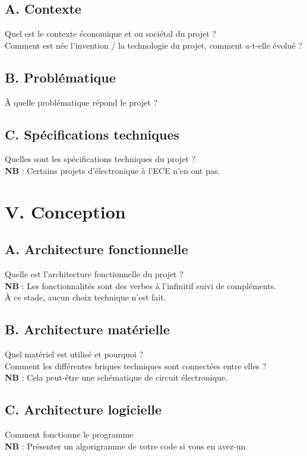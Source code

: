 \documentclass[a4paper,11pt]{book}
\begin{document}
\subsection*{A. Contexte}
Quel est le contexte économique et ou sociétal du projet ?\\
\noindent Comment est née l’invention / la technologie du projet, comment a-t-elle évolué ?


\subsection*{B. Problématique}
À quelle problématique répond le projet ?

\subsection*{C. Spécifications techniques}
Quelles sont les spécifications techniques du projet ?\\
\noindent \textbf{NB} : Certains projets d’électronique à l’ECE n’en ont pas.

\newpage
\section*{V. Conception}
\subsection*{A. Architecture fonctionnelle}
Quelle est l’architecture fonctionnelle du projet ? \\
\noindent \textbf{NB} : Les fonctionnalités sont des verbes à l’infinitif suivi de compléments.\\
\noindent À ce stade, aucun choix technique n’est fait.

\subsection*{B. Architecture matérielle}
Quel matériel est utilisé et pourquoi ?\\
\noindent Comment les différentes briques techniques sont connectées entre elles ?\\
\noindent\textbf{NB} : Cela peut-être une schématique de circuit électronique.


\subsection*{C. Architecture logicielle}
Comment fonctionne le programme\\
\noindent \textbf{NB} : Présenter un algorigramme de votre code si vous en avez-un.
\end{document}
